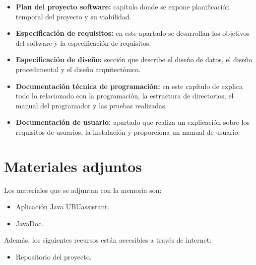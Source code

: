 \begin{itemize}
\tightlist
\item
  \textbf{Plan del proyecto software:} capítulo donde se expone planificación temporal del proyecto y su viabilidad.
\item
  \textbf{Especificación de requisitos:} en este apartado se desarrollan los objetivos del software y la especificación de requisitos.
\item
  \textbf{Especificación de diseño:} sección que describe el diseño de datos, el diseño procedimental y el diseño arquitectónico.
\item
  \textbf{Documentación técnica de programación:} en este capítulo de explica todo lo relacionado con la programación, la estructura de directorios, el manual del programador y las pruebas realizadas.
\item
  \textbf{Documentación de usuario:} apartado que realiza un explicación sobre los requisitos de usuarios, la instalación y proporciona un manual de usuario.
\end{itemize}

\section{Materiales adjuntos}\label{materiales-adjuntos}

Los materiales que se adjuntan con la memoria son: 

\begin{itemize}
\tightlist
\item
	Aplicación Java UBUassistant.
\item	
	JavaDoc.
\end{itemize}

Además, los siguientes recursos están accesibles a través de internet:

\begin{itemize}
\tightlist
\item
  Repositorio del proyecto. \cite{ubuassistant:repo}
\end{itemize}

